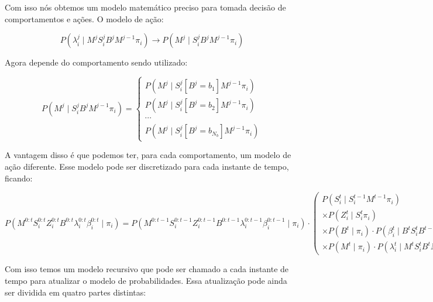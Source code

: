 Com isso nós obtemos um modelo matemático preciso para tomada decisão de comportamentos e ações. O modelo de ação:

\begin{equation}
    P \left( \lambda_i^j \mid M^j S_i^j B^j M^{j-1} \pi_i \right) \rightarrow P \left( M^j \mid S_i^j B^j M^{j-1} \pi_i \right)
\end{equation}

Agora depende do comportamento sendo utilizado:

\begin{equation}
    P \left( M^j \mid S_i^j B^j M^{j-1} \pi_i \right) = 
        \left\{
            \begin{array}{l}
                P \left( M^j \mid S_i^j \left[ B^j=b_1 \right] M^{j-1} \pi_i \right) \\
                P \left( M^j \mid S_i^j \left[ B^j=b_2 \right] M^{j-1} \pi_i \right) \\
                \cdots \\
                P \left( M^j \mid S_i^j \left[ B^j=b_{N_b} \right] M^{j-1} \pi_i \right)
            \end{array}
        \right.
\end{equation}

A vantagem disso é que podemos ter, para cada comportamento, um modelo de ação diferente. Esse modelo pode ser discretizado para cada instante de tempo, ficando:

\begin{equation}
    P \left( M^{0: t} S_i^{0: t} Z_i^{0: t} B^{0: t} \lambda_i^{0: t} \beta_i^{0: t} \mid \pi_i \right) = P \left( M^{0:t-1} S_i^{0:t-1} Z_i^{0:t-1} B^{0:t-1} \lambda_i^{0:t-1} \beta_i^{0:t-1} \mid \pi_i \right) \cdot 
        \left(
            \begin{array}{l}
                P \left( S_i^t \mid S_i^{t -1} M^{t-1} \pi_i \right) \\
                \times P \left( Z_i^t \mid S_i^t \pi_i \right) \\
                \times P \left( B^t \mid \pi_i \right) \cdot P \left( \beta_i^t \mid B^t S_i^t B^{t-1} \pi_i \right) \\
                \times P \left( M^t \mid \pi_i \right) \cdot P \left( \lambda_i^t \mid M^t S_i^t B^t M^{t-1} \pi_i \right)
            \end{array}
        \right)
\end{equation}

Com isso temos um modelo recursivo que pode ser chamado a cada instante de tempo para atualizar o modelo de probabilidades. Essa atualização pode ainda ser dividida em quatro partes distintas:

